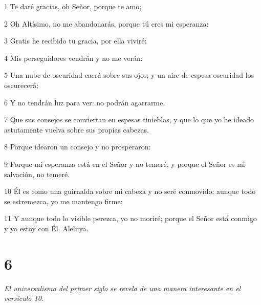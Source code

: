 \par 1 Te daré gracias, oh Señor, porque te amo;
\par 2 Oh Altísimo, no me abandonarás, porque tú eres mi esperanza:
\par 3 Gratis he recibido tu gracia, por ella viviré:
\par 4 Mis perseguidores vendrán y no me verán:
\par 5 Una nube de oscuridad caerá sobre sus ojos; y un aire de espesa oscuridad los oscurecerá:
\par 6 Y no tendrán luz para ver: no podrán agarrarme.
\par 7 Que sus consejos se conviertan en espesas tinieblas, y que lo que yo he ideado astutamente vuelva sobre sus propias cabezas.
\par 8 Porque idearon un consejo y no prosperaron:
\par 9 Porque mi esperanza está en el Señor y no temeré, y porque el Señor es mi salvación, no temeré.
\par 10 Él es como una guirnalda sobre mi cabeza y no seré conmovido; aunque todo se estremezca, yo me mantengo firme;
\par 11 Y aunque todo lo visible perezca, yo no moriré; porque el Señor está conmigo y yo estoy con Él. Aleluya.

\chapter{6}

\par \textit{El universalismo del primer siglo se revela de una manera interesante en el versículo 10.}

